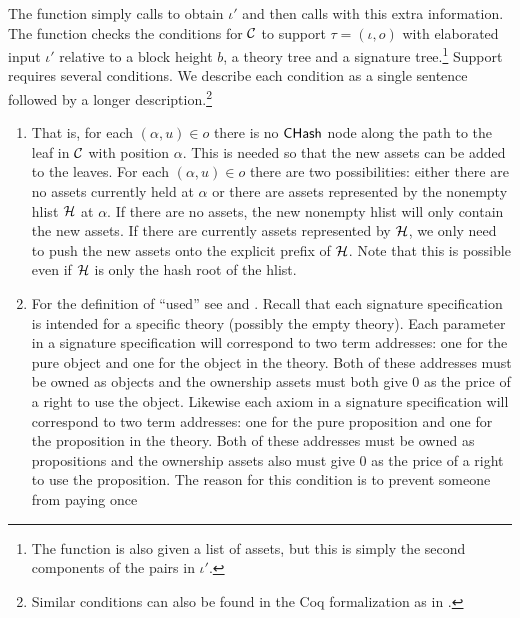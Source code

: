 The function {} simply
calls {} to obtain $\iota'$
and then calls {} with this extra information.
The function {} checks the conditions for
$\mathcal{C}$ to support $\tau=(\iota,o)$ with elaborated input $\iota'$
relative to a block height $b$, a theory tree and a signature tree.\footnote{The function {} is also given a list of assets, but this is simply the second components of the pairs in $\iota'$.}
Support requires several conditions.
We describe each condition as a single sentence followed by
a longer description.\footnote{Similar conditions can also be found in the Coq formalization as {} in {}.}
\begin{enumerate}
\item {}
That is, for each $(\alpha,u)\in o$ there is no ${\constr{CHash}}$ node along the
path to the leaf in $\mathcal{C}$ with position $\alpha$.
This is needed so that the new assets can be added to the leaves.
For each $(\alpha,u)\in o$ there are two possibilities: either there are no assets currently
held at $\alpha$
or there are assets represented by the nonempty hlist $\mathcal{H}$ at $\alpha$.
If there are no assets, the new nonempty hlist will only contain the new assets.
If there are currently assets represented by $\mathcal{H}$, we only need to
push the new assets onto the explicit prefix of $\mathcal{H}$.
Note that this is possible even if $\mathcal{H}$ is only the hash root of the hlist.
\item {}
For the definition of ``used'' see
{}
and
{}.
Recall that each signature specification is intended for a specific theory (possibly the empty theory).
Each parameter in a signature specification will correspond to two term
addresses: one for the pure object and one for the object in the theory.
Both of these addresses must be owned as objects and the ownership assets
must both give $0$ as the price of a right to use the object.
Likewise each axiom in a signature specification will correspond to two term
addresses: one for the pure proposition and one for the proposition in the theory.
Both of these addresses must be owned as propositions and the ownership assets
also must give $0$ as the price of a right to use the proposition.
The reason for this condition is to prevent someone from paying once

\end{enumerate}
